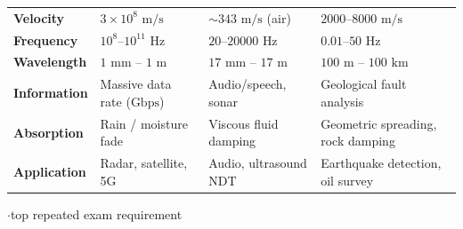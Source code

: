 {\begin{tabularx}{\linewidth}{@{}L{1.7cm}X X X@{}}
\textbf{Velocity}      & $3 \times 10^8\text{ m/s}$ & $\sim 343\text{ m/s}$ (air) & $2000\text{--}8000\text{ m/s}$ \\
\textbf{Frequency}     & $10^8\text{--}10^{11}\text{ Hz}$ & $20\text{--}20000\text{ Hz}$ & $0.01\text{--}50\text{ Hz}$ \\
\textbf{Wavelength}    & $1\text{ mm -- } 1\text{ m}$ & $17\text{ mm -- } 17\text{ m}$ & $100\text{ m -- } 100\text{ km}$ \\
\textbf{Information}   & Massive data rate ($\text{Gbps}$) & Audio/speech, sonar & Geological fault analysis \\
\textbf{Absorption}    & Rain / moisture fade & Viscous fluid damping & Geometric spreading, rock damping \\
\textbf{Application}   & Radar, satellite, 5G & Audio, ultrasound NDT & Earthquake detection, oil survey \\
\bottomrule
\end{tabularx}}

\vspace{2pt}


{\color{sub}\footnotesize {}  \gap$\cdot$\gap top repeated exam requirement}

